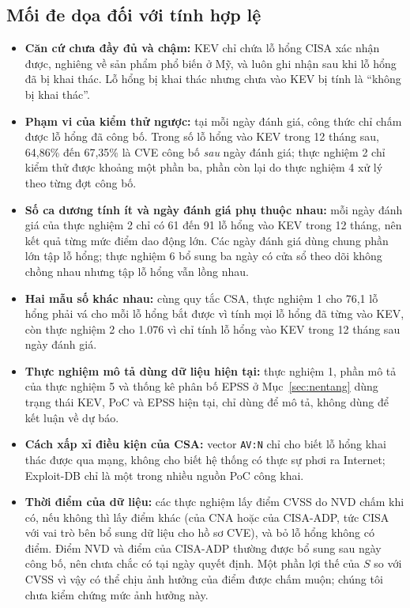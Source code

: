 \documentclass[runningheads]{llncs}
\begin{document}
\subsection{Mối đe dọa đối với tính hợp lệ}
\begin{itemize}
\item \textbf{Căn cứ chưa đầy đủ và chậm:} KEV chỉ chứa lỗ hổng CISA xác nhận được, nghiêng
về sản phẩm phổ biến ở Mỹ, và luôn ghi nhận sau khi lỗ hổng đã bị khai thác. Lỗ hổng bị khai
thác nhưng chưa vào KEV bị tính là ``không bị khai thác''.
\item \textbf{Phạm vi của kiểm thử ngược:} tại mỗi ngày đánh giá, công thức chỉ chấm được lỗ
hổng đã công bố. Trong số lỗ hổng vào KEV trong 12 tháng sau, 64,86\% đến 67,35\% là CVE công bố
\emph{sau} ngày đánh giá; thực nghiệm 2 chỉ kiểm thử được khoảng một phần ba, phần còn lại do
thực nghiệm 4 xử lý theo từng đợt công bố.
\item \textbf{Số ca dương tính ít và ngày đánh giá phụ thuộc nhau:} mỗi ngày đánh giá của thực nghiệm 2 chỉ có 61 đến 91
lỗ hổng vào KEV trong 12 tháng, nên kết quả từng mức điểm dao động lớn. Các ngày đánh giá dùng
chung phần lớn tập lỗ hổng; thực nghiệm 6 bổ sung ba ngày có cửa sổ theo dõi không chồng nhau
nhưng tập lỗ hổng vẫn lồng nhau.
\item \textbf{Hai mẫu số khác nhau:} cùng quy tắc CSA, thực nghiệm 1 cho 76,1 lỗ hổng phải vá
cho mỗi lỗ hổng bắt được vì tính mọi lỗ hổng đã từng vào KEV, còn thực nghiệm 2 cho 1.076 vì
chỉ tính lỗ hổng vào KEV trong 12 tháng sau ngày đánh giá.
\item \textbf{Thực nghiệm mô tả dùng dữ liệu hiện tại:} thực nghiệm 1, phần mô tả của thực nghiệm
5 và thống kê phân bố EPSS ở Mục~\ref{sec:nentang} dùng trạng thái KEV, PoC và EPSS hiện tại, chỉ dùng để mô tả, không
dùng để kết luận về dự báo.
\item \textbf{Cách xấp xỉ điều kiện của CSA:} vector \texttt{AV:N} chỉ cho biết lỗ hổng khai
thác được qua mạng, không cho biết hệ thống có thực sự phơi ra Internet; Exploit-DB chỉ là một
trong nhiều nguồn PoC công khai.
\item \textbf{Thời điểm của dữ liệu:} các thực nghiệm lấy điểm CVSS do NVD chấm khi có, nếu không thì lấy điểm khác (của CNA hoặc của CISA-ADP, tức CISA với vai trò bên bổ sung dữ liệu cho hồ sơ CVE), và bỏ lỗ hổng không có điểm. Điểm NVD và điểm của CISA-ADP thường được bổ sung sau ngày công bố, nên chưa chắc có tại ngày quyết định. Một phần lợi thế của $S$ so với CVSS vì vậy có thể chịu ảnh hưởng của điểm được chấm muộn; chúng tôi chưa kiểm chứng mức ảnh hưởng này.
\end{itemize}
\end{document}
